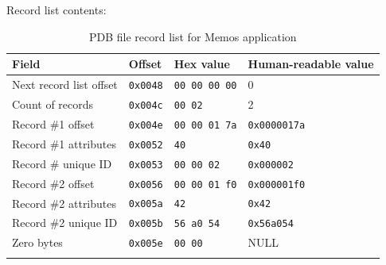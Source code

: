 \documentclass[a4paper,12pt,oneside]{scrartcl}
\begin{document}
Record list contents:
\begin{longtable}{|p{3cm}|l|l|p{5cm}|}
  \hline
  \textbf{Field} & \textbf{Offset} & \textbf{Hex value} & \textbf{Human-readable value} \\
  \hline
  Next record list offset & \texttt{0x0048} & \texttt{00 00 00 00} & 0 \\
  \hline
  Count of records & \texttt{0x004c} & \texttt{00 02} & 2 \\
  \hline
  Record \#1 offset & \texttt{0x004e} & \texttt{00 00 01 7a} & \texttt{0x0000017a} \\
  \hline
  Record \#1 attributes & \texttt{0x0052} & \texttt{40} & \texttt{0x40} \\
  \hline
  Record \# unique ID & \texttt{0x0053} & \texttt{00 00 02} & \texttt{0x000002} \\
  \hline
  Record \#2 offset & \texttt{0x0056} & \texttt{00 00 01 f0} & \texttt{0x000001f0} \\
  \hline
  Record \#2 attributes & \texttt{0x005a} & \texttt{42} & \texttt{0x42} \\
  \hline
  Record \#2 unique ID & \texttt{0x005b} & \texttt{56 a0 54} & \texttt{0x56a054} \\
  \hline
  Zero bytes & \texttt{0x005e} & \texttt{00 00} & NULL \\
  \hline
  \caption{PDB file record list for Memos application}
  \label{tab:memo-record-list}
\end{longtable}
\end{document}
